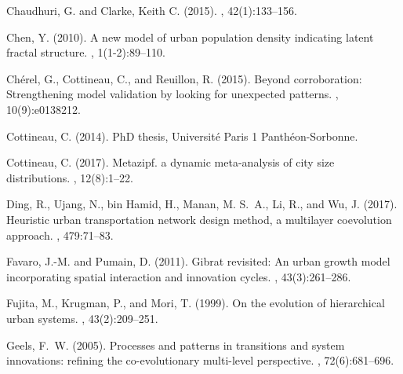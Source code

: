 \documentclass[11pt]{article}
\begin{document}
\begin{thebibliography}{}
{Chaudhuri, G. and Clarke, Keith C.} ({2015}).
,
  42(1):133--156.

Chen, Y. (2010).
\newblock A new model of urban population density indicating latent fractal
  structure.
,
  1(1-2):89--110.

Ch{\'e}rel, G., Cottineau, C., and Reuillon, R. (2015).
\newblock Beyond corroboration: Strengthening model validation by looking for
  unexpected patterns.
, 10(9):e0138212.

Cottineau, C. (2014).
\newblock PhD thesis, Universit{\'e} Paris 1 Panth{\'e}on-Sorbonne.

Cottineau, C. (2017).
\newblock Metazipf. a dynamic meta-analysis of city size distributions.
, 12(8):1--22.

Ding, R., Ujang, N., bin Hamid, H., Manan, M. S.~A., Li, R., and Wu, J. (2017).
\newblock Heuristic urban transportation network design method, a multilayer
  coevolution approach.
,
  479:71--83.

Favaro, J.-M. and Pumain, D. (2011).
\newblock Gibrat revisited: An urban growth model incorporating spatial
  interaction and innovation cycles.
, 43(3):261--286.

Fujita, M., Krugman, P., and Mori, T. (1999).
\newblock On the evolution of hierarchical urban systems.
, 43(2):209--251.

Geels, F.~W. (2005).
\newblock Processes and patterns in transitions and system innovations:
  refining the co-evolutionary multi-level perspective.
, 72(6):681--696.


\end{thebibliography}
\end{document}
